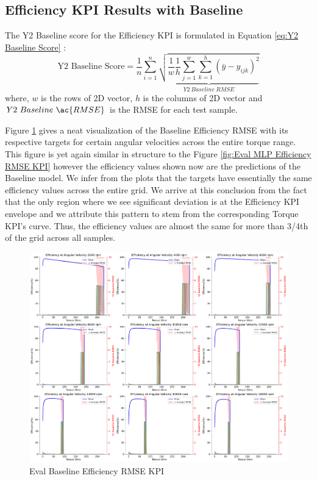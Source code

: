 \documentclass{report} %
\begin{document}
\subsection{Efficiency \ac{KPI} Results with Baseline}\label{sec:3D Efficiency Grid Results with Baseline}

The Y2 Baseline score for the Efficiency \ac{KPI} is formulated in Equation \ref{eq:Y2 Baseline Score} :
\begin{equation}
    \text{Y2 Baseline Score} = \frac{1}{n} \sum_{i=1}^{n} \underbrace{ \sqrt{\frac{1}{w} \frac{1}{h} \sum_{j=1}^{w} \sum_{k=1}^{h} (\bar{y} - y_{ijk})^2}}_{Y2\ Baseline\ RMSE}
    \label{eq:Y2 Baseline Score}
\end{equation}
where, \(w\) is the rows of 2\ac{D} vector, \(h\) is the columns of 2\ac{D} vector and \(Y2\ Baseline\ \ac{RMSE}\) is the \ac{RMSE} for each test sample.

Figure \ref{fig:Eval Baseline Efficiency RMSE KPI} gives a neat visualization of the Baseline Efficiency \ac{RMSE} with its respective targets for certain angular velocities  
across the entire torque range. This figure is yet again similar in structure to the Figure \ref{fig:Eval MLP Efficiency RMSE KPI} however the efficiency values 
shown now are the predictions of the Baseline model. We infer from the plots that the targets have essentially the same efficiency values across the entire grid.
We arrive at this conclusion from the fact that the only region where we see significant deviation is at the Efficiency \ac{KPI} envelope and we attribute this 
pattern to stem from the corresponding Torque \ac{KPI}'s curve. Thus, the efficiency values are almost the same for more than 3/4th of the grid across all samples.
\begin{figure}[H]
    \centering
    \includegraphics[width=1\textwidth]{./ReportImages/rmse_eta_Baseline.png} 
    \caption{Eval Baseline Efficiency \ac{RMSE} \ac{KPI}} 
    \label{fig:Eval Baseline Efficiency RMSE KPI}
\end{figure}
\end{document}
